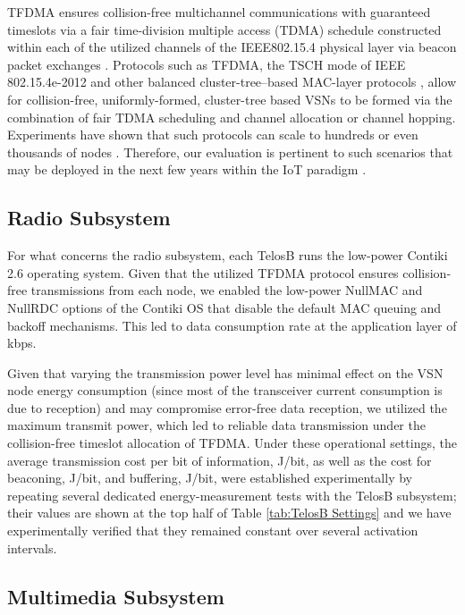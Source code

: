 \documentclass[twocolumn,english]{IEEEtran}
\theoremstyle{plain}
\theoremstyle{definition}
\begin{document}
TFDMA ensures collision-free multichannel communications with guaranteed
timeslots via a fair time-division multiple access (TDMA) schedule
constructed within each of the utilized channels of the IEEE802.15.4
physical layer via beacon packet exchanges \cite{burana2012DTFDMA}.
Protocols such as TFDMA, the TSCH mode of IEEE 802.15.4e-2012 \cite{tinka2010TSCH}
and other balanced cluster-tree--based MAC-layer protocols \cite{AlvesClusterTreeGTS,wang2012IPV6,zuo2012two,koubaa2006gts},
allow for collision-free, uniformly-formed, cluster-tree based VSNs
to be formed via the combination of fair TDMA scheduling and channel
allocation or channel hopping. Experiments have shown that such protocols
can scale to hundreds or even thousands of nodes \cite{pister2008tsmp}.
Therefore, our evaluation is pertinent to such scenarios that may
be deployed in the next few years within the IoT paradigm \cite{zorzi2010IoT,gubbi2013IoT}.


\subsection{Radio Subsystem }

For what concerns the radio subsystem, each TelosB runs the low-power
Contiki 2.6 operating system. Given that the utilized TFDMA protocol
ensures collision-free transmissions from each node, we enabled the
low-power NullMAC and NullRDC options of the Contiki OS that disable
the default MAC queuing and backoff mechanisms. This led to data consumption
rate at the application layer of  kbps. 

Given that varying the transmission power level has minimal effect
on the VSN node energy consumption (since most of the transceiver
current consumption is due to reception) and may compromise error-free
data reception, we utilized the maximum transmit power, which led
to reliable data transmission under the collision-free timeslot allocation
of TFDMA. Under these operational settings, the average transmission
cost per bit of information,  J/bit, as well as the cost for beaconing,
 J/bit, and buffering,  J/bit, were established experimentally
by repeating several dedicated energy-measurement tests with the TelosB
subsystem; their values are shown at the top half of Table \ref{tab:TelosB Settings}
and we have experimentally verified that they remained constant over
several activation intervals. 


\subsection{Multimedia Subsystem }
\end{document}
